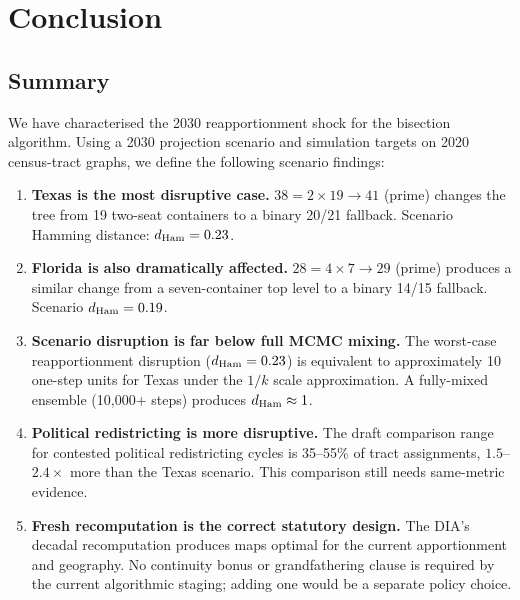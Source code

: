 \section{Conclusion}
\label{sec:conclusion}

\subsection{Summary}

We have characterised the 2030 reapportionment shock for the \ar{}
bisection algorithm.
Using a 2030 projection scenario and simulation targets on 2020 census-tract
graphs, we define the following scenario findings:

\begin{enumerate}
\item \textbf{Texas is the most disruptive case.}
      $38 = 2 \times 19 \to 41$ (prime) changes the tree from 19 two-seat
      containers to a binary 20/21 fallback.
      Scenario Hamming distance: $d_{\rm Ham} = 0.23$.

\item \textbf{Florida is also dramatically affected.}
      $28 = 4 \times 7 \to 29$ (prime) produces a similar change from a
      seven-container top level to a binary 14/15 fallback.
      Scenario $d_{\rm Ham} = 0.19$.

\item \textbf{Scenario disruption is far below full MCMC mixing.}
      The worst-case reapportionment disruption ($d_{\rm Ham} = 0.23$)
      is equivalent to approximately 10 one-step \recom{} units for Texas
      under the $1/k$ scale approximation.
      A fully-mixed ensemble (10{,}000+ steps) produces $d_{\rm Ham} \approx 1$.

\item \textbf{Political redistricting is more disruptive.}
      The draft comparison range for contested political redistricting cycles
      is 35--55\% of tract assignments, $1.5$--$2.4\times$ more than the
      Texas scenario.  This comparison still needs same-metric evidence.

\item \textbf{Fresh recomputation is the correct statutory design.}
      The DIA's decadal recomputation produces maps optimal for the current
      apportionment and geography.
      No continuity bonus or grandfathering clause is required by the current
      algorithmic staging; adding one would be a separate policy choice.
\end{enumerate}

